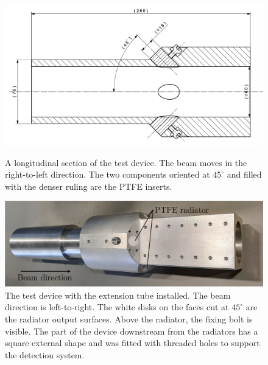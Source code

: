 \begin{figure}[!t]
\centering
\includegraphics[width=14cm, keepaspectratio]{pictures/sketch_CLEAR}
\caption{A longitudinal section of the test device. The beam moves in the right-to-left direction. The two components oriented at $45^\circ$ and filled with the denser ruling are the PTFE inserts.}
\label{fig:Sketch_clear_bpm}


\vspace{5mm}
\centering
\includegraphics[width=13cm, keepaspectratio]{pictures/bpm+pipe+caption}
\caption{The test device with the extension tube installed. The beam direction is left-to-right. The white disks on the faces cut at $45^\circ$ are the radiator output surfaces. Above the radiator, the fixing bolt is visible. The part of the device downstream from the radiators has a square external shape and was fitted with threaded holes to support the detection system.}
\label{fig:clear_bpm_lab}
\end{figure}
